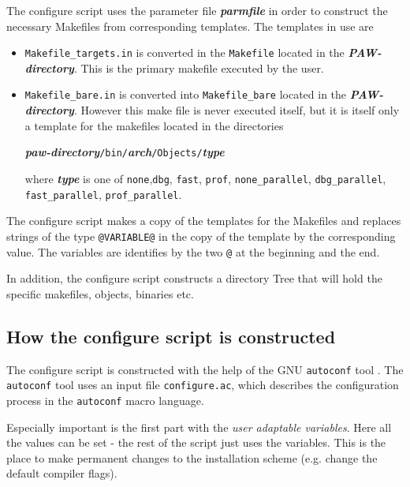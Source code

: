 \documentclass[a4paper,10pt]{report}
\newcommand{\myspec}[1]{\textbf{\textit{#1}}}
\newcommand{\mytt}[1]{{\tt #1}}
\begin{document}
The configure script uses the parameter file \myspec{parmfile} in
order to construct the necessary Makefiles from corresponding
templates. The templates in use are
\begin{itemize}
\item \mytt{Makefile\_targets.in} is converted in the \mytt{Makefile}
located in the \myspec{PAW-directory}. This is the primary makefile
executed by the user.
\item \mytt{Makefile\_bare.in} is converted into \mytt{Makefile\_bare}
located in the \myspec{PAW-directory}. However this make file is never
executed itself, but it is itself only a template for the makefiles located in the directories
\begin{center}
\myspec{paw-directory}\mytt{/bin/}\myspec{arch}\mytt{/Objects/}\myspec{type}
\end{center}
where \myspec{type} is one of \mytt{none},\mytt{dbg}, \mytt{fast},
\mytt{prof}, \mytt{none\_parallel}, \mytt{dbg\_parallel},
\mytt{fast\_parallel}, \mytt{prof\_parallel}.
\end{itemize}

The configure script makes a copy of the templates for the Makefiles
and replaces strings of the type \mytt{@VARIABLE@} in the copy of the
template by the corresponding value. The variables are identifies by
the two \mytt{@} at the beginning and the end.

In addition, the configure script constructs a directory Tree that will
hold the specific makefiles, objects, binaries etc.

\subsection{How the configure script is constructed}

The configure script is constructed with the help of the GNU
\mytt{autoconf} tool . The \mytt{autoconf} tool uses an input file
\mytt{configure.ac}, which describes the configuration process in the
\mytt{autoconf} macro language.

Especially important is the first part with the \emph{user adaptable
variables}. Here all the values can be set - the rest of the script just uses
the variables.  This is the place to make permanent changes to the installation
scheme (e.g. change the default compiler flags).
\end{document}
